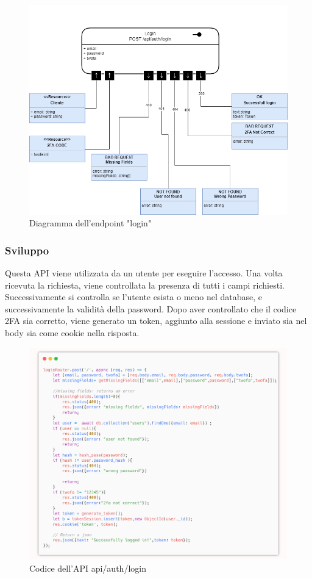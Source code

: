 \documentclass{report}
\begin{document}
\begin{figure}[H]
	\centering\includegraphics[width=1\textwidth]{images/microservizio-autenticazione/diagrams/diagramma_login.drawio.png}
	\caption{Diagramma dell'endpoint "login"}
\end{figure}


\subsubsection*{Sviluppo}
Questa API viene utilizzata da un utente per eseguire l'accesso.
Una volta ricevuta la richiesta, viene controllata la presenza di tutti i campi richiesti.
Successivamente si controlla se l'utente esista o meno nel database, e successivamente la validità della password.
Dopo aver controllato che il codice 2FA sia corretto, viene generato un token, aggiunto alla sessione e inviato sia nel body sia come cookie nella risposta.


\begin{figure}[H]
	\centering\includegraphics[width=1\textwidth]{images/microservizio-autenticazione/login-carbon.png}
	Codice dell'API api/auth/login
\end{figure}
\end{document}
